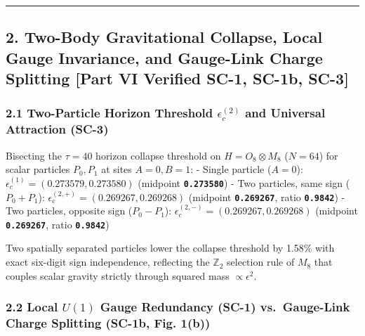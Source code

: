 \documentclass[
  a4paper,
]{article}
\begin{document}
\begin{center}\rule{0.5\linewidth}{0.5pt}\end{center}

\subsection{2. Two-Body Gravitational Collapse, Local Gauge Invariance,
and Gauge-Link Charge Splitting {[}Part VI Verified SC-1, SC-1b,
SC-3{]}}\label{two-body-gravitational-collapse-local-gauge-invariance-and-gauge-link-charge-splitting-part-vi-verified-sc-1-sc-1b-sc-3}

\subsubsection{\texorpdfstring{2.1 Two-Particle Horizon Threshold
\(\epsilon_c^{(2)}\) and Universal Attraction
(SC-3)}{2.1 Two-Particle Horizon Threshold \textbackslash epsilon\_c\^{}\{(2)\} and Universal Attraction (SC-3)}}\label{two-particle-horizon-threshold-epsilon_c2-and-universal-attraction-sc-3}

Bisecting the \(\tau=40\) horizon collapse threshold on
\(H = O_8 \otimes M_8\) (\(N=64\)) for scalar particles \(P_0, P_1\) at
sites \(A=0, B=1\): - Single particle (\(A=0\)):
\(\epsilon_c^{(1)} = (0.273579, 0.273580)\) (midpoint
\textbf{\texttt{0.273580}}) - Two particles, same sign (\(P_0 + P_1\)):
\(\epsilon_c^{(2,+)} = (0.269267, 0.269268)\) (midpoint
\textbf{\texttt{0.269267}}, ratio \textbf{\texttt{0.9842}}) - Two
particles, opposite sign (\(P_0 - P_1\)):
\(\epsilon_c^{(2,-)} = (0.269267, 0.269268)\) (midpoint
\textbf{\texttt{0.269267}}, ratio \textbf{\texttt{0.9842}})

Two spatially separated particles lower the collapse threshold by 1.58\%
with exact six-digit sign independence, reflecting the \(\mathbb{Z}_2\)
selection rule of \(M_8\) that couples scalar gravity strictly through
squared mass \(\propto \epsilon^2\).

\subsubsection{\texorpdfstring{2.2 Local \(U(1)\) Gauge Redundancy
(SC-1) vs.~Gauge-Link Charge Splitting (SC-1b, Fig.
1(b))}{2.2 Local U(1) Gauge Redundancy (SC-1) vs.~Gauge-Link Charge Splitting (SC-1b, Fig. 1(b))}}\label{local-u1-gauge-redundancy-sc-1-vs.-gauge-link-charge-splitting-sc-1b-fig.-1b}
\end{document}
